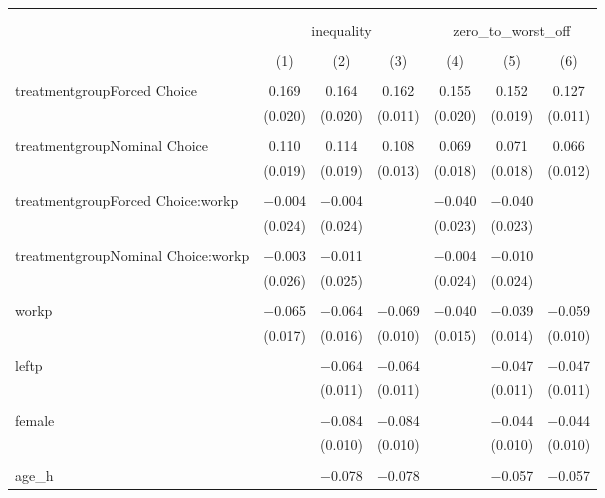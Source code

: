 
\begin{table}[!htbp] \centering 
  \caption{} 
  \label{} 
\begin{tabular}{@{\extracolsep{5pt}}lcccccc} 
\\[-1.8ex]\hline 
\hline \\[-1.8ex] 
\\[-1.8ex] & \multicolumn{3}{c}{inequality} & \multicolumn{3}{c}{zero\_to\_worst\_off} \\ 
\\[-1.8ex] & (1) & (2) & (3) & (4) & (5) & (6)\\ 
\hline \\[-1.8ex] 
 treatmentgroupForced Choice & 0.169 & 0.164 & 0.162 & 0.155 & 0.152 & 0.127 \\ 
  & (0.020) & (0.020) & (0.011) & (0.020) & (0.019) & (0.011) \\ 
  & & & & & & \\ 
 treatmentgroupNominal Choice & 0.110 & 0.114 & 0.108 & 0.069 & 0.071 & 0.066 \\ 
  & (0.019) & (0.019) & (0.013) & (0.018) & (0.018) & (0.012) \\ 
  & & & & & & \\ 
 treatmentgroupForced Choice:workp & $-$0.004 & $-$0.004 &  & $-$0.040 & $-$0.040 &  \\ 
  & (0.024) & (0.024) &  & (0.023) & (0.023) &  \\ 
  & & & & & & \\ 
 treatmentgroupNominal Choice:workp & $-$0.003 & $-$0.011 &  & $-$0.004 & $-$0.010 &  \\ 
  & (0.026) & (0.025) &  & (0.024) & (0.024) &  \\ 
  & & & & & & \\ 
 workp & $-$0.065 & $-$0.064 & $-$0.069 & $-$0.040 & $-$0.039 & $-$0.059 \\ 
  & (0.017) & (0.016) & (0.010) & (0.015) & (0.014) & (0.010) \\ 
  & & & & & & \\ 
 leftp &  & $-$0.064 & $-$0.064 &  & $-$0.047 & $-$0.047 \\ 
  &  & (0.011) & (0.011) &  & (0.011) & (0.011) \\ 
  & & & & & & \\ 
 female &  & $-$0.084 & $-$0.084 &  & $-$0.044 & $-$0.044 \\ 
  &  & (0.010) & (0.010) &  & (0.010) & (0.010) \\ 
  & & & & & & \\ 
 age\_h &  & $-$0.078 & $-$0.078 &  & $-$0.057 & $-$0.057 \\ 

\end{tabular}
\end{table}
